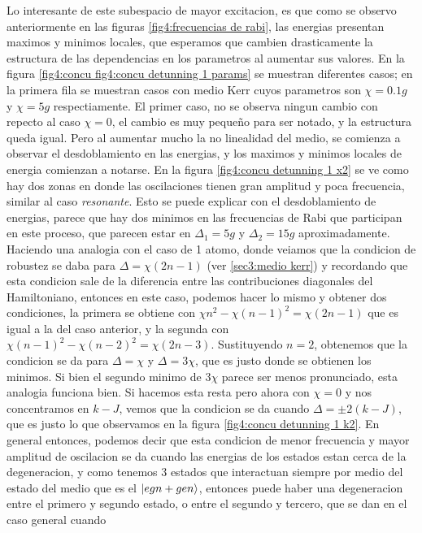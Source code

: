 Lo interesante de este subespacio de mayor excitacion, es que como se observo anteriormente en las figuras \ref{fig4:frecuencias de rabi}, las energias presentan maximos y minimos locales, que esperamos que cambien drasticamente la estructura de las dependencias en los parametros al aumentar sus valores. En la figura \ref{fig4:concu fig4:concu detunning 1 params} se muestran diferentes casos; en la primera fila se muestran casos con medio Kerr cuyos parametros son $\chi=0.1g$ y $\chi=5g$ respectiamente. El primer caso, no se observa ningun cambio con repecto al caso $\chi=0$, el cambio es muy pequeño para ser notado, y la estructura queda igual. Pero al aumentar mucho la no linealidad del medio, se comienza a observar el desdoblamiento en las energias, y los maximos y minimos locales de energia comienzan a notarse. En la figura \ref{fig4:concu detunning 1 x2} se ve como hay dos zonas en donde las oscilaciones tienen gran amplitud y poca frecuencia, similar al caso \textit{resonante}. Esto se puede explicar con el desdoblamiento de energias, parece que hay dos minimos en las frecuencias de Rabi que participan en este proceso, que parecen estar en $\Delta_1=5g$ y $\Delta_2=15g$ aproximadamente. Haciendo una analogia con el caso de 1 atomo, donde veiamos que la condicion de robustez se daba para $\Delta=\chi(2n-1)$ (ver \ref{sec3:medio kerr}) y recordando que esta condicion sale de la diferencia entre las contribuciones diagonales del Hamiltoniano, entonces en este caso, podemos hacer lo mismo y obtener dos condiciones, la primera se obtiene con $\chi n^2-\chi(n-1)^2=\chi(2n-1)$ que es igual a la del caso anterior, y la segunda con $\chi(n-1)^2-\chi(n-2)^2=\chi(2n-3)$. Sustituyendo $n=2$, obtenemos que la condicion se da para $\Delta=\chi$ y $\Delta=3\chi$, que es justo donde se obtienen los minimos. Si bien el segundo minimo de $3\chi$ parece ser menos pronunciado, esta analogia funciona bien.
Si hacemos esta resta pero ahora con $\chi=0$ y nos concentramos en $k-J$, vemos que la condicion se da cuando $\Delta=\pm 2(k-J)$, que es justo lo que observamos en la figura \ref{fig4:concu detunning 1 k2}. En general entonces, podemos decir que esta condicion de menor frecuencia y mayor amplitud de oscilacion se da cuando las energias de los estados estan cerca de la degeneracion, y como tenemos 3 estados que interactuan siempre por medio del estado del medio que es el $\ket{egn+gen}$, entonces puede haber una degeneracion entre el primero y segundo estado, o entre el segundo y tercero, que se dan en el caso general cuando


